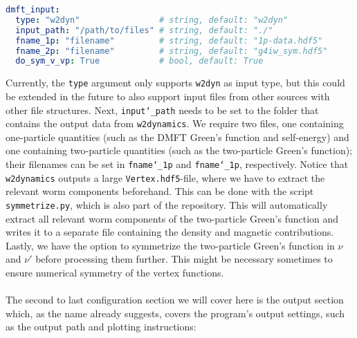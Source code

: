 \documentclass[\main/main.tex]{subfiles}
\begin{document}
\begin{minipage}{\textwidth}%
\begin{lstlisting}[language=yaml]
dmft_input:
  type: "w2dyn"                # string, default: "w2dyn"
  input_path: "/path/to/files" # string, default: "./"
  fname_1p: "filename"         # string, default: "1p-data.hdf5"
  fname_2p: "filename"         # string, default: "g4iw_sym.hdf5"
  do_sym_v_vp: True            # bool, default: True
\end{lstlisting}
\end{minipage}
Currently, the \texttt{type} argument only supports \texttt{w2dyn} as input type, but this could be extended in the future to also support input files from other sources with other file structures. Next, \texttt{input\char`_path} needs to be set to the folder that contains the output data from \texttt{w2dynamics}. We require two files, one containing one-particle quantities (such as the DMFT Green's function and self-energy) and one containing two-particle quantities (such as the two-particle Green's function); their filenames can be set in \texttt{fname\char`_1p} and \texttt{fname\char`_1p}, respectively. Notice that \texttt{w2dynamics} outputs a large \texttt{Vertex.hdf5}-file, where we have to extract the relevant worm components beforehand. This can be done with the script \texttt{symmetrize.py}, which is also part of the repository. This will automatically extract all relevant worm components of the two-particle Green's function and writes it to a separate file containing the density and magnetic contributions. Lastly, we have the option to symmetrize the two-particle Green's function in $\nu$ and $\nu'$ before processing them further. This might be necessary sometimes to ensure numerical symmetry of the vertex functions.
\\\\
The second to last configuration section we will cover here is the output section which, as the name already suggests, covers the program's output settings, such as the output path and plotting instructions: 
 
\end{document}
